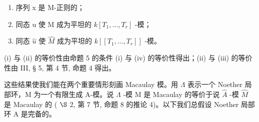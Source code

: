 \begin{enumerate}
\def\labelenumi{(\roman{enumi})}
\item
  序列 x 是 M-正则的；
\item
  同态 u 使 M 成为平坦的 \(k[T_{1},\ldots,T_{r}]\) -模；
\item
  同态 \(\hat{u}\) 使 \(\hat{M}\) 成为平坦的 \(k[[T_{1},\ldots,T_{r}]]\) -模。
\end{enumerate}

(i) 与 (ii) 的等价性由命题 5 的条件 (i) 与 (iv) 的等价性得出；(ii) 与 (iii) 的等价性由 III, § 5, 第 4 节, 命题 4 得出。

这些结果使我们能在两个重要情形刻画 Macaulay 模。用 \(\Lambda\) 表示一个 Noether 局部环，M 为一个有限生成 A-模。说 \(\Lambda\) -模 M 是 Macaulay 的等价于说 \(\widehat{A}\) -模 \(\widehat{M}\) 是 Macaulay 的 ( \(\S\) 2, 第 7 节, 命题 8 的推论 4)。以下我们总假设 Noether 局部环 A 是完备的。

